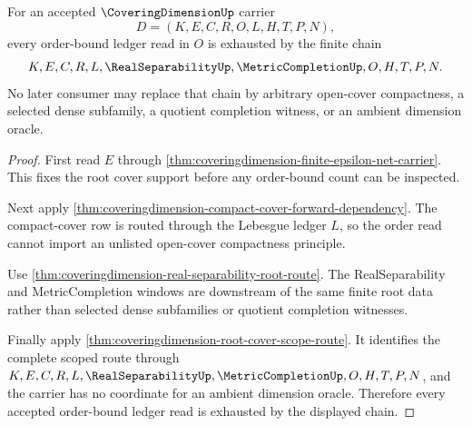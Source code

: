 \begin{theorem}
\label{thm:coveringdimension-root-cover-order-ledger-exhaustion}
For an accepted $\CoveringDimensionUp$ carrier
$$
D=(K,E,C,R,O,L,H,T,P,N),
$$
every order-bound ledger read in $O$ is exhausted by the finite chain
$$
K,E,C,R,L,\RealSeparabilityUp,\MetricCompletionUp,O,H,T,P,N .
$$
No later consumer may replace that chain by arbitrary open-cover compactness, a selected dense subfamily, a quotient completion witness, or an ambient dimension oracle.
\end{theorem}
\begin{proof}
First read $E$ through \autoref{thm:coveringdimension-finite-epsilon-net-carrier}. This fixes the root cover support before any order-bound count can be inspected.

Next apply \autoref{thm:coveringdimension-compact-cover-forward-dependency}. The compact-cover row is routed through the Lebesgue ledger $L$, so the order read cannot import an unlisted open-cover compactness principle.

Use \autoref{thm:coveringdimension-real-separability-root-route}. The RealSeparability and MetricCompletion windows are downstream of the same finite root data rather than selected dense subfamilies or quotient completion witnesses.

Finally apply \autoref{thm:coveringdimension-root-cover-scope-route}. It identifies the complete scoped route through $K,E,C,R,L,\RealSeparabilityUp,\MetricCompletionUp,O,H,T,P,N$, and the carrier has no coordinate for an ambient dimension oracle. Therefore every accepted order-bound ledger read is exhausted by the displayed chain.
\end{proof}

